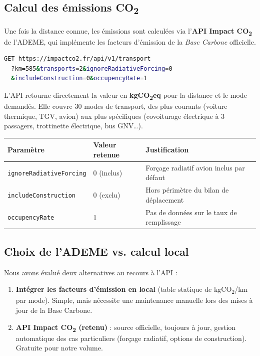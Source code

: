 \documentclass[11pt,a4paper]{article}
\begin{document}
\subsection{Calcul des émissions CO\textsubscript{2}}

Une fois la distance connue, les émissions sont calculées via l'\textbf{API Impact CO\textsubscript{2}} de l'ADEME, qui implémente les facteurs d'émission de la \textit{Base Carbone} officielle.

\begin{lstlisting}[language=bash, caption={Appel à l'API Impact CO2 (exemple : TGV sur 585 km)}]
GET https://impactco2.fr/api/v1/transport
  ?km=585&transports=2&ignoreRadiativeForcing=0
  &includeConstruction=0&occupencyRate=1
\end{lstlisting}

L'API retourne directement la valeur en \textbf{kgCO\textsubscript{2}eq} pour la distance et le mode demandés. Elle couvre 30 modes de transport, des plus courants (voiture thermique, TGV, avion) aux plus spécifiques (covoiturage électrique à 3 passagers, trottinette électrique, bus GNV…).

\begin{center}
\begin{tabular}{llp{6.5cm}}
\toprule
\textbf{Paramètre} & \textbf{Valeur retenue} & \textbf{Justification} \\
\midrule
\texttt{ignoreRadiativeForcing} & 0 (inclus) & Forçage radiatif avion inclus par défaut \\
\texttt{includeConstruction}    & 0 (exclu)  & Hors périmètre du bilan de déplacement \\
\texttt{occupencyRate}          & 1          & Pas de données sur le taux de remplissage \\
\bottomrule
\end{tabular}
\end{center}

\subsection{Choix de l'ADEME vs. calcul local}

Nous avons évalué deux alternatives au recours à l'API :
\begin{enumerate}
  \item \textbf{Intégrer les facteurs d'émission en local} (table statique de kgCO\textsubscript{2}/km par mode). Simple, mais nécessite une maintenance manuelle lors des mises à jour de la Base Carbone.
  \item \textbf{API Impact CO\textsubscript{2} (retenu)} : source officielle, toujours à jour, gestion automatique des cas particuliers (forçage radiatif, options de construction). Gratuite pour notre volume.
\end{enumerate}
\end{document}

